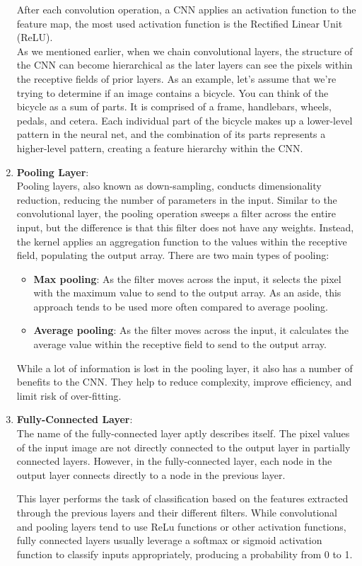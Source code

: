 \begin{enumerate}
        After each convolution operation, a CNN applies an activation function to the feature map, the most used activation function is the Rectified Linear Unit (ReLU).\\
        As we mentioned earlier, when we chain convolutional layers, the structure of the CNN can become hierarchical as the later layers can see the pixels within the receptive fields of prior layers. As an example, let’s assume that we’re trying to determine if an image contains a bicycle. You can think of the bicycle as a sum of parts. It is comprised of a frame, handlebars, wheels, pedals, and cetera. Each individual part of the bicycle makes up a lower-level pattern in the neural net, and the combination of its parts represents a higher-level pattern, creating a feature hierarchy within the CNN.
    \item \textbf{Pooling Layer}:\\
        Pooling layers, also known as down-sampling, conducts dimensionality reduction, reducing the number of parameters in the input. Similar to the convolutional layer, the pooling operation sweeps a filter across the entire input, but the difference is that this filter does not have any weights. Instead, the kernel applies an aggregation function to the values within the receptive field, populating the output array. There are two main types of pooling:
        \begin{itemize}
            \item \textbf{Max pooling}: As the filter moves across the input, it selects the pixel with the maximum value to send to the output array. As an aside, this approach tends to be used more often compared to average pooling.
            \item \textbf{Average pooling}: As the filter moves across the input, it calculates the average value within the receptive field to send to the output array.
        \end{itemize}
        
        While a lot of information is lost in the pooling layer, it also has a number of benefits to the CNN. They help to reduce complexity, improve efficiency, and limit risk of over-fitting.
    
    \item \textbf{Fully-Connected Layer}:\\
        The name of the fully-connected layer aptly describes itself. The pixel values of the input image are not directly connected to the output layer in partially connected layers. However, in the fully-connected layer, each node in the output layer connects directly to a node in the previous layer.

        This layer performs the task of classification based on the features extracted through the previous layers and their different filters. While convolutional and pooling layers tend to use ReLu functions or other activation functions, fully connected layers usually leverage a softmax or sigmoid activation function to classify inputs appropriately, producing a probability from 0 to 1.
        
\end{enumerate}

